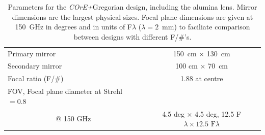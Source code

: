 \documentclass[11pt,a4paper]{article}
\newcommand{\coreplus}{\textit{\negthinspace COrE+\/}}
\begin{document}
\begin{table}[h!]
	\centering
	\begin{tabular}{|l|c|}
		\hline
		Primary mirror   & 150~cm $\times$ 130~cm   \\
		Secondary mirror   & 100 cm $\times$ 70~cm  \\
		Focal ratio (F/\#)               & 1.88 at centre   \\
		\multicolumn{1}{|l|}{FOV, Focal plane diameter at Strehl $= 0.8$} & \\
		\multicolumn{1}{|c|}{@ 150 GHz}    & 4.5 deg $\times$ 4.5 deg, 12.5 F$\lambda \times 12.5 \text{~F}\lambda$ \\
		\hline
		
	\end{tabular}
	\caption{Parameters for the \coreplus Gregorian design, including the alumina lens.  Mirror dimensions are the largest physical sizes.  Focal plane dimensions are given at 150~GHz in degrees and in units of F$\lambda$ ($\lambda=2$~mm) to faciliate comparison between 
		designs with different F/\#'s. }
	\label{tab:mirrors_greg}
\end{table}
\end{document}
